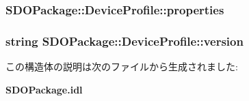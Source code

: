 \subsubsection[{properties}]{ {\bf SDOPackage::DeviceProfile::properties}}\label{structSDOPackage_1_1DeviceProfile_a6945952e1a03ed66975f8880ad66cc8b}
\subsubsection[{version}]{\setlength{\rightskip}{0pt plus 5cm}string {\bf SDOPackage::DeviceProfile::version}}\label{structSDOPackage_1_1DeviceProfile_adcf7a5ff087fb27effb546f9adcd9c1e}


この構造体の説明は次のファイルから生成されました:\begin{DoxyCompactItemize}
\item 
{\bf SDOPackage.idl}\end{DoxyCompactItemize}
